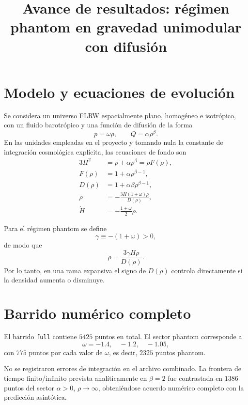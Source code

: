 \documentclass[11pt,a4paper]{article}
\title{\textbf{Avance de resultados: régimen phantom en gravedad unimodular con difusión}}
\author{}
\date{}
\begin{document}
\maketitle

\section{Modelo y ecuaciones de evolución}

Se considera un universo FLRW espacialmente plano, homogéneo e isotrópico,
con un fluido barotrópico y una función de difusión de la forma
\begin{equation}
    p=\omega\rho,
    \qquad
    Q=\alpha\rho^\beta.
\end{equation}
En las unidades empleadas en el proyecto y tomando nula la constante de
integración cosmológica explícita, las ecuaciones de fondo son
\begin{align}
    3H^2 &= \rho+\alpha\rho^\beta
    =\rho F(\rho),\\
    F(\rho)&=1+\alpha\rho^{\beta-1},\\
    D(\rho)&=1+\alpha\beta\rho^{\beta-1},\\
    \dot{\rho}
    &=
    -\frac{3H(1+\omega)\rho}{D(\rho)},\\
    \dot H&=-\frac{1+\omega}{2}\rho.
\end{align}

Para el régimen phantom se define
\begin{equation}
    \gamma\equiv-(1+\omega)>0,
\end{equation}
de modo que
\begin{equation}
    \dot\rho=
    \frac{3\gamma H\rho}{D(\rho)}.
\end{equation}
Por lo tanto, en una rama expansiva el signo de $D(\rho)$ controla
directamente si la densidad aumenta o disminuye.

\section{Barrido numérico completo}

El barrido \texttt{full} contiene $5425$ puntos en total. El sector phantom
corresponde a
\[
\omega=-1.4,\quad -1.2,\quad -1.05,
\]
con $775$ puntos por cada valor de $\omega$, es decir, $2325$ puntos phantom.

No se registraron errores de integración en el archivo combinado.
La frontera de tiempo finito/infinito prevista analíticamente en
$\beta=2$ fue contrastada en $1386$ puntos del sector
$\alpha>0$, $\rho\rightarrow\infty$, obteniéndose acuerdo numérico completo
con la predicción asintótica.
\end{document}
